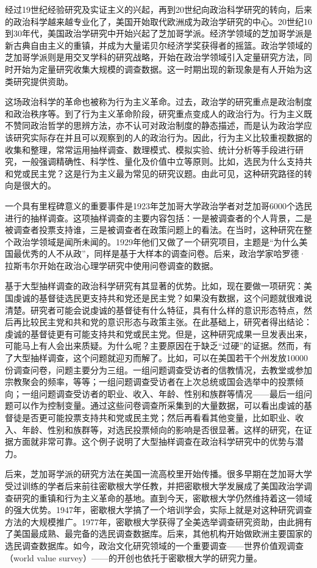 经过19世纪经验研究及实证主义的兴起，再到20世纪向政治科学研究的转向，后来的政治科学越来越专业化了，美国开始取代欧洲成为政治学研究的中心。20世纪10到30年代，美国政治学研究中开始兴起了芝加哥学派。经济学领域的芝加哥学派是新古典自由主义的重镇，并成为大量诺贝尔经济学奖获得者的摇篮。政治学领域的芝加哥学派则是用交叉学科的研究战略，开始在政治学领域引入定量研究方法，同时开始为定量研究收集大规模的调查数据。这一时期出现的新现象是有人开始为这类研究提供资助。

这场政治科学的革命也被称为行为主义革命。过去，政治学的研究重点是政治制度和政治秩序等。到了行为主义革命阶段，研究重点变成人的政治行为。行为主义既不赞同政治哲学的思辨方法，亦不认可对政治制度的静态描述，而是认为政治学应该研究实际存在并且可以观察到的人的政治行为。因此，行为主义比较重视数据的收集和整理，常常运用抽样调查、数理模式、模拟实验、统计分析等手段进行研究，一般强调精确性、科学性、量化及价值中立等原则。比如，选民为什么支持共和党或民主党？这是行为主义最为常见的研究议题。由此可见，这种研究路径的转向是很大的。

一个具有里程碑意义的重要事件是1923年芝加哥大学政治学者对芝加哥6000个选民进行的抽样调查。这项抽样调查的主要内容包括：一是被调查者的个人背景，二是被调查者投票支持谁，三是被调查者在政策问题上的看法。在当时，这种研究在整个政治学领域是闻所未闻的。1929年他们又做了一个研究项目，主题是“为什么美国最优秀的人不从政”，同样是基于大样本的调查问卷。后来，政治学家哈罗德·拉斯韦尔开始在政治心理学研究中使用问卷调查的数据。

基于大型抽样调查的政治科学研究有其显著的优势。比如，现在要做一项研究：美国虔诚的基督徒选民更支持共和党还是民主党？如果没有数据，这个问题就很难说清楚。研究者可能会说虔诚的基督徒有什么特征，具有什么样的意识形态特点，然后再比较民主党和共和党的意识形态与政策主张。在此基础上，研究者得出结论：虔诚的基督徒更有可能支持共和党或民主党。但是，这种研究成果一旦发表出来，可能马上有人会出来质疑。为什么呢？主要原因在于缺乏“过硬”的证据。然而，有了大型抽样调查，这个问题就迎刃而解了。比如，可以在美国若干个州发放10000份调查问卷，问题主要分为三组。一组问题调查受访者的信教情况，去教堂或参加宗教聚会的频率，等等；一组问题调查受访者在上次总统或国会选举中的投票倾向；一组问题调查受访者的职业、收入、年龄、性别和族群等情况——最后一组问题可以作为控制变量。通过这些问卷调查所采集到的大量数据，可以看出虔诚的基督徒是否更可能投票支持共和党或民主党；然后再看看其他变量，比如职业、收入、年龄、性别和族群等，对选民投票倾向的影响是否很显著。这样的研究，在证据方面就非常可靠。这个例子说明了大型抽样调查在政治科学研究中的优势与潜力。

后来，芝加哥学派的研究方法在美国一流高校里开始传播。很多早期在芝加哥大学受过训练的学者后来前往密歇根大学任教，并把密歇根大学发展成了美国政治学调查研究的重镇和行为主义革命的基地。直到今天，密歇根大学仍然维持着这一领域的强大优势。1947年，密歇根大学搞了一个培训学会，实际上就是对这种研究调查方法的大规模推广。1977年，密歇根大学获得了全美选举调查研究资助，由此拥有了美国最成熟、最完备的选民调查数据库。后来，其他机构开始做欧洲主要国家的选民调查数据库。如今，政治文化研究领域的一个重要调查——世界价值观调查（world value survey）——的开创也依托于密歇根大学的研究力量。

